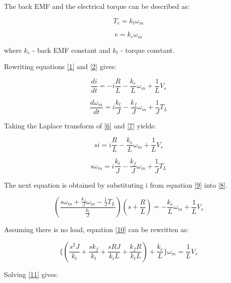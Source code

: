 The back EMF and the electrical torque can be described as:

\begin{equation}
\label{4}
	T_{e}=k_{t}\omega_{m}
\end{equation}

\begin{equation}
\label{5}
	e=k_{e}\omega_{m}
\end{equation}

where $k_{e}$ - back EMF constant and $k_{t}$ - torque constant.

Rewriting equations \ref{1} and \ref{2} gives:

\begin{equation}
\label{6}
	\frac{di}{dt}=-i\frac{R}{L}-\frac{k_{e}}{L}\omega_{m}+\frac{1}{L}V_{s}
\end{equation}

\begin{equation}
\label{7}
	\frac{d\omega_{m}}{dt}=i\frac{k_{t}}{J}-\frac{k_{f}}{J}\omega_{m}+\frac{1}{J}T_{L}
\end{equation}

Taking the Laplace transform of \ref{6} and \ref{7} yields:

\begin{equation}
\label{8}
	si=i\frac{R}{L}-\frac{k_{e}}{L}\omega_{m}+\frac{1}{L}V_{s}
\end{equation}

\begin{equation}
\label{9}
	s\omega_{m}=i\frac{k_{t}}{J}-\frac{k_{f}}{J}\omega_{m}+\frac{1}{J}T_{L}
\end{equation}

The next equation is obtained by substituting i from equation \ref{9} into \ref{8}.

\begin{equation}
\label{10}
	(\frac{s\omega_{m}+\frac{k_{f}}{J}\omega_{m}-\frac{1}{J}T_{L}}{\frac{k_{t}}{J}})(s+\frac{R}{L})=-\frac{k_{e}}{L}\omega_{m}+\frac{1}{L}V_{s}
\end{equation}  

Assuming there is no load, equation \ref{10} can be rewritten as:

\begin{equation}
\label{11}
	\lbrace{(\frac{s^{2}J}{k_{t}}+\frac{sk_{f}}{k_{t}}+\frac{sRJ}{k_{t}L}+\frac{k_{f}R}{k_{t}L})+\frac{k_{e}}{L}}\rbrace\omega_{m}=\frac{1}{L}V_{s}
\end{equation}

Solving \ref{11} gives:

